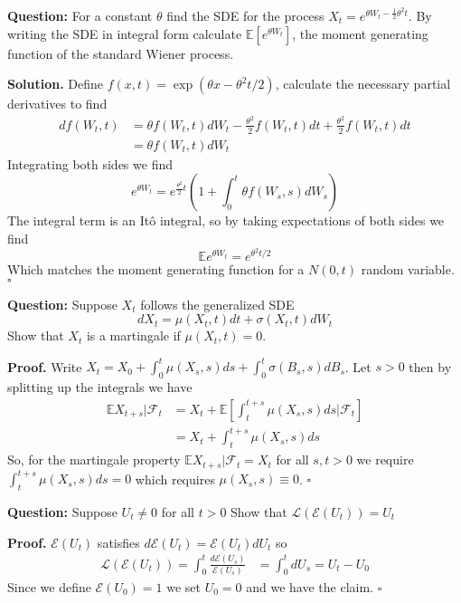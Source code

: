 \documentclass{article}
\begin{document}
\begin{tcolorbox}[colframe=black,colback=gray!5,boxrule=0.5pt]
\textbf{Question:} For a constant $\theta$ find the SDE for the process $X_t = e^{\theta W_t - \frac{1}{2}\theta^2 t}$. By writing the SDE in integral form calculate $\mathbb{E}[e^{\theta W_t}]$, the moment generating function of the standard Wiener process. 
\end{tcolorbox}
\textbf{Solution.} Define $f(x,t) = \exp(\theta x - \theta^2t/2)$, calculate the necessary partial derivatives to find
\begin{align*}
    df(W_t,t) &= \theta f(W_t,t)dW_t - \frac{\theta^2}{2}f(W_t,t)dt + \frac{\theta^2}{2}f(W_t,t)dt \\
    &= \theta f(W_t,t)dW_t
\end{align*}
Integrating both sides we find 
$$e^{\theta W_t} = e^{\frac{\theta^2}{2}t}\left(1 + \int_0^t\theta f(W_s,s)dW_s\right)$$
The integral term is an Itô integral, so by taking expectations of both sides we find 
$$\mathbb{E}e^{\theta W_t} = e^{\theta^2t/2}$$
Which matches the moment generating function for a $N(0,t)$ random variable. $\square$

\begin{tcolorbox}[colframe=black,colback=gray!5,boxrule=0.5pt]
\textbf{Question:} Suppose $X_t$ follows the generalized SDE 
$$dX_t = \mu(X_t,t)dt + \sigma(X_t,t)dW_t$$
Show that $X_t$ is a martingale if $\mu(X_t,t)=0.$
\end{tcolorbox}
\textbf{Proof.} Write $X_t = X_0+\int_0^t\mu(X_s,s)ds + \int_0^t\sigma(B_s,s)dB_s$. Let $s>0$ then by splitting up the integrals we have 
\begin{align*}
    \mathbb{E}X_{t+s} | \mathcal{F}_t &= X_t + \mathbb{E}\left[\int_t^{t+s} \mu(X_s,s)ds | \mathcal{F}_t\right] \\
    &= X_t + \int_{t}^{t+s}\mu(X_s, s)ds
\end{align*}
So, for the martingale property $\mathbb{E}X_{t+s} | \mathcal{F}_t = X_t$ for all $s,t>0$ we require $\int_t^{t+s}\mu(X_s,s)ds = 0$ which requires $\mu(X_s,s)\equiv0$. $\square$


\begin{tcolorbox}[colframe=black,colback=gray!5,boxrule=0.5pt]
\textbf{Question:} Suppose $U_t\neq 0$ for all $t>0$ Show that $\mathcal{L}(\mathcal{E}(U_t)) = U_t$
\end{tcolorbox}
\textbf{Proof.} $\mathcal{E}(U_t)$ satisfies $d\mathcal{E}(U_t) = \mathcal{E}(U_t)dU_t$ so
\begin{align*}
    \mathcal{L}(\mathcal{E}(U_t)) = \int_0^t \frac{d\mathcal{E}(U_s)}{\mathcal{E}(U_s)} &= \int_0^tdU_s = U_t-U_0
\end{align*}
Since we define $\mathcal{E}(U_0)=1$ we set $U_0=0$ and we have the claim. $\square$ 
\end{document}
